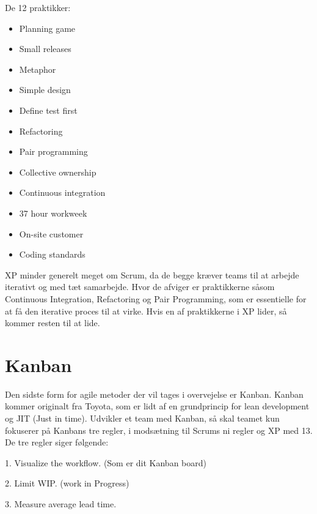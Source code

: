 De 12 praktikker: 
\begin{itemize}
    \item Planning game

    \item Small releases
  
    \item Metaphor

    \item Simple design 

    \item Define test first

    \item Refactoring
 
    \item Pair programming

    \item Collective ownership
   
    \item Continuous integration 

    \item 37 hour workweek 

    \item On-site customer 
    
    \item Coding standards 
\end{itemize}

XP minder generelt meget om Scrum, da de begge kræver teams til at arbejde iterativt og med tæt samarbejde. Hvor de afviger er praktikkerne såsom Continuous Integration, Refactoring og Pair Programming, som er essentielle for at få den iterative proces til at virke. Hvis en af praktikkerne i XP lider, så kommer resten til at lide. 

\section{Kanban}

Den sidste form for agile metoder der vil tages i overvejelse er Kanban. Kanban kommer originalt fra Toyota, som er lidt af en grundprincip for lean development og JIT (Just in time)\cite{SlideKanban}. Udvikler et team med Kanban, så skal teamet kun fokuserer på Kanbans tre regler, i modsætning til Scrums ni regler og XP med 13. De tre regler siger følgende: 

1. Visualize the workflow. (Som er dit Kanban board)

2. Limit WIP. (work in Progress)

3. Measure average lead time.

